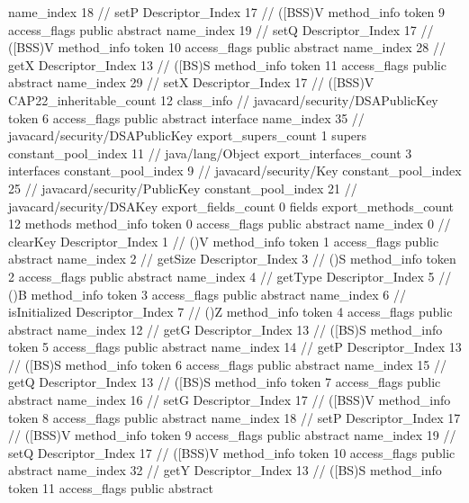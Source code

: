 {{{{{					name_index	18		// setP
					Descriptor_Index	17		// ([BSS)V
				}
				method_info {
					token	9
					access_flags	public abstract
					name_index	19		// setQ
					Descriptor_Index	17		// ([BSS)V
				}
				method_info {
					token	10
					access_flags	public abstract
					name_index	28		// getX
					Descriptor_Index	13		// ([BS)S
				}
				method_info {
					token	11
					access_flags	public abstract
					name_index	29		// setX
					Descriptor_Index	17		// ([BSS)V
				}
			}
			CAP22_inheritable_count	12
		}
		class_info {		// javacard/security/DSAPublicKey
			token	6
			access_flags	public abstract interface
			name_index	35		// javacard/security/DSAPublicKey
			export_supers_count	1
			supers {
				constant_pool_index	11		// java/lang/Object
			}
			export_interfaces_count	3
			interfaces {
				constant_pool_index	9		// javacard/security/Key
				constant_pool_index	25		// javacard/security/PublicKey
				constant_pool_index	21		// javacard/security/DSAKey
			}
			export_fields_count	0
			fields {
			}
			export_methods_count	12
			methods {
				method_info {
					token	0
					access_flags	public abstract
					name_index	0		// clearKey
					Descriptor_Index	1		// ()V
				}
				method_info {
					token	1
					access_flags	public abstract
					name_index	2		// getSize
					Descriptor_Index	3		// ()S
				}
				method_info {
					token	2
					access_flags	public abstract
					name_index	4		// getType
					Descriptor_Index	5		// ()B
				}
				method_info {
					token	3
					access_flags	public abstract
					name_index	6		// isInitialized
					Descriptor_Index	7		// ()Z
				}
				method_info {
					token	4
					access_flags	public abstract
					name_index	12		// getG
					Descriptor_Index	13		// ([BS)S
				}
				method_info {
					token	5
					access_flags	public abstract
					name_index	14		// getP
					Descriptor_Index	13		// ([BS)S
				}
				method_info {
					token	6
					access_flags	public abstract
					name_index	15		// getQ
					Descriptor_Index	13		// ([BS)S
				}
				method_info {
					token	7
					access_flags	public abstract
					name_index	16		// setG
					Descriptor_Index	17		// ([BSS)V
				}
				method_info {
					token	8
					access_flags	public abstract
					name_index	18		// setP
					Descriptor_Index	17		// ([BSS)V
				}
				method_info {
					token	9
					access_flags	public abstract
					name_index	19		// setQ
					Descriptor_Index	17		// ([BSS)V
				}
				method_info {
					token	10
					access_flags	public abstract
					name_index	32		// getY
					Descriptor_Index	13		// ([BS)S
				}
				method_info {
					token	11
					access_flags	public abstract
}}}}}
